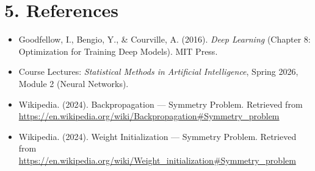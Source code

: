 \documentclass[11pt,a4paper]{article}
\begin{document}
\section*{5. References}
\begin{itemize}
    \item Goodfellow, I., Bengio, Y., \& Courville, A. (2016). \textit{Deep Learning} (Chapter 8: Optimization for Training Deep Models). MIT Press.
    \item Course Lectures: \textit{Statistical Methods in Artificial Intelligence}, Spring 2026, Module 2 (Neural Networks).
    \item Wikipedia. (2024). Backpropagation --- Symmetry Problem. Retrieved from \url{https://en.wikipedia.org/wiki/Backpropagation#Symmetry_problem}
    \item Wikipedia. (2024). Weight Initialization --- Symmetry Problem. Retrieved from \url{https://en.wikipedia.org/wiki/Weight_initialization#Symmetry_problem}
\end{itemize}
\end{document}
